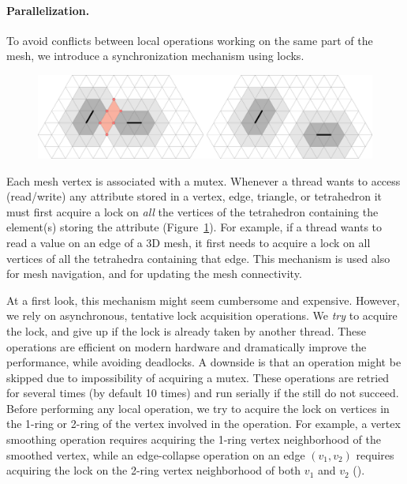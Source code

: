 \paragraph{Parallelization.} To avoid conflicts between local operations working on the same part of the mesh, we introduce a synchronization mechanism using locks. 

\begin{figure}\centering\footnotesize
    \includegraphics[width=\linewidth]{wmtk-tex/figs/lock_illustration}
    \caption{}
    \label{fig:lock-example}
\end{figure}

Each mesh vertex is associated with a mutex. Whenever a thread wants to access (read/write) any attribute stored in a vertex, edge, triangle, or tetrahedron it must first acquire a lock on \emph{all} the vertices of the tetrahedron containing the element(s) storing the attribute (Figure~\ref{fig:lock-example}). For example, if a thread wants to read a value on an edge of a 3D mesh, it first needs to acquire a lock on all vertices of all the tetrahedra containing that edge. This mechanism is used also for mesh navigation, and for updating the mesh connectivity. 

At a first look, this mechanism might seem cumbersome and expensive. However, we rely on asynchronous, tentative lock acquisition operations. We \emph{try} to acquire the lock, and give up if the lock is already taken by another thread. These operations are efficient on modern hardware and dramatically improve the performance, while avoiding deadlocks. A downside is that an operation might be skipped due to impossibility of acquiring a mutex. These operations are retried for several times (by default 10 times) and run serially if the still do not succeed. Before performing any local operation, we try to acquire the lock on vertices in the 1-ring or 2-ring of the vertex involved in the operation. For example, a vertex smoothing operation requires acquiring the 1-ring vertex neighborhood of the smoothed vertex, while an edge-collapse operation on an edge $(v_1, v_2)$ requires acquiring the lock on the 2-ring vertex neighborhood of both $v_1$ and $v_2$
().

